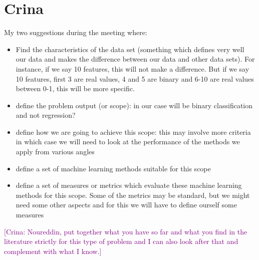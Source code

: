 \documentclass[a4paper,12pt, english]{article}
\newcommand{\kibitz}[2]{\ifnum\Comments=1\textcolor{#1}{#2}\fi}
\newcommand{\cg}[1]  {\kibitz{purple}   {[Crina: #1]}}
\begin{document}
\section{Crina}
My two suggestions during the meeting where:
\begin{itemize}
\item Find the characteristics of the data set (something which defines very well our data and makes the difference between our data and other data sets). For instance, if we say 10 features, this will not make a difference. But if we say 10 features, first 3 are real values, 4 and 5 are binary and 6-10 are real values between 0-1, this will be more specific.
\item define the problem output (or scope): in our case will be binary classification and not regression?
\item define how we are going to achieve this scope: this may involve more criteria in which case we will need to look at the performance of the methods we apply from various angles
\item define a set of machine learning methods suitable for this scope
\item define a set of measures or metrics which evaluate these machine learning methods for this scope. Some of the metrics may be standard, but we might need some other aspects and for this we will have to define ourself some measures
\end{itemize}

\cg{Noureddin, put together what you have so far and what you find in the literature strictly for this type of problem  and I can also look after that and complement with what I know.}
		
\end{document}
